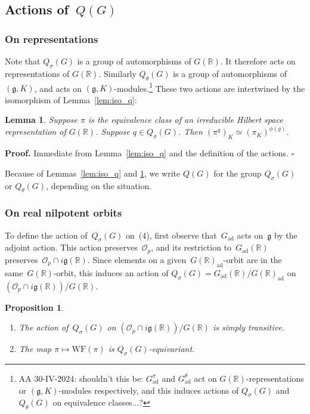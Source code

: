 \documentclass[10pt,leqno]{article}
\newtheorem{lemma}[equation]{Lemma}
\newtheorem{proposition}[equation]{Proposition}
\newcommand{\qed}{\hfill $\square$ \medskip}
\newenvironment{proof}[1][Proof]{\noindent\textbf{#1.} }{\qed}
\newcommand{\Gad}{G_\mathrm{ad}}
\renewcommand{\O}{\mathcal O}
\newcommand{\R}{\mathbb R}
\newcommand{\g}{\mathfrak g}
\newcommand{\WF}{\mathrm{WF}}
\newcommand{\Op}{\O_p}
\begin{document}
\subsection{Actions of~$Q(G)$}


\subsubsection*{On representations} 



Note that $Q_\sigma(G)$ is a group of automorphisms of $G(\R)$. It therefore acts on representations of $G(\R)$. 
Similarly $Q_\theta(G)$ is a group of automorphisms of $(\g,K)$, and acts on $(\g,K)$-modules.\footnote{AA 30-IV-2024: shouldn't this be:  $\Gad^\sigma$ and $\Gad^\theta$  act on $G(\R)$-representations or $(\g,K)$-modules respectively, and this induces actions of $Q_{\sigma}(G)$ and $Q_{\theta}(G)$ on equivalence classes...?}
These two actions are intertwined by the isomorphism of Lemma~\ref{lem:iso_q}:

\begin{lemma}\label{lem:action_q}
Suppose $\pi$ is the equivalence class of an irreducible Hilbert space representation of $G(\R)$. 
Suppose $q\in Q_\sigma(G)$. 
Then $(\pi^q)_K\simeq (\pi_K)^{\phi(g)}$.
\end{lemma}

\begin{proof}
Immediate from Lemma~\ref{lem:iso_q} and the definition of the actions.
\end{proof}

Because of Lemmas~\ref{lem:iso_q} and \ref{lem:action_q}, we write $Q(G)$ for the group $Q_\sigma(G)$ or $Q_\theta(G)$, depending on the situation.



\subsubsection*{On real nilpotent orbits} 

To define the action of~$Q_{\sigma}(G)$ on~(4), first observe that~$\Gad$ acts on~$\g$ by the adjoint action. This action preserves~$\Op$, and its restriction to~$\Gad(\R)$ preserves~$\Op\cap i\g(\R)$. Since elements on a given~$G(\R)_{\mathrm{ad}}$-orbit are in the same~$G(\R)$-orbit, this induces an action of $Q_{\sigma}(G)=\Gad(\R)/G(\R)_{\mathrm{ad}}$ on~$(\Op\cap i\g(\R))/G(\R)$.

\begin{proposition}\label{prop:action_on_real_orbits}
\begin{enumerate} 
\item The action of~$Q_{\sigma}(G)$ on $(\Op\cap i\g(\R))/G(\R)$ is simply transitive.
\item The map $\pi \mapsto \WF(\pi)$ is $Q_{\sigma}(G)$-equivariant.
\end{enumerate}
\end{proposition}
\end{document}
